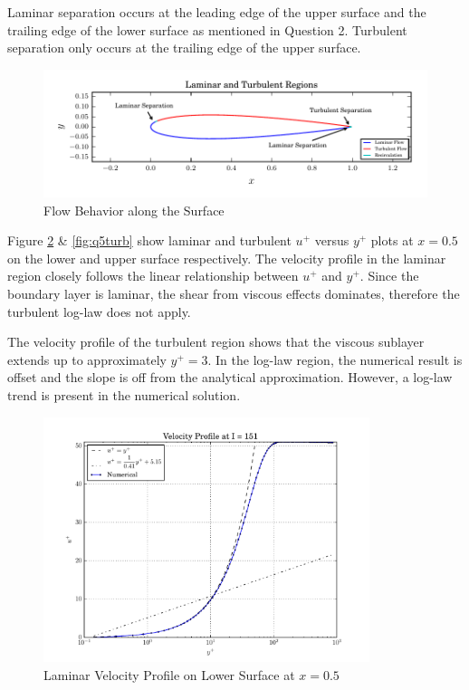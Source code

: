 \documentclass[letterpaper,12pt,]{article}
\begin{document}
Laminar separation occurs at the leading edge of the upper surface and the trailing edge of the lower surface as mentioned in Question 2.
Turbulent separation only occurs at the trailing edge of the upper surface.

\begin{figure}[!h]
    \centering
    \includegraphics[width = 1.0\textwidth]{./Figures/q4airfoil.pdf}
    \caption {Flow Behavior along the Surface}
    \label{fig:q4air}
\end{figure}

Figure \ref{fig:q5lam} \& \ref{fig:q5turb} show laminar and turbulent $u^+$ versus $y^+$ plots at $x=0.5$ on the lower and upper surface respectively.
The velocity profile in the laminar region closely follows the linear relationship between $u^+$ and $y^+$.
Since the boundary layer is laminar, the shear from viscous effects dominates, therefore the turbulent log-law does not apply.

The velocity profile of the turbulent region shows that the viscous sublayer extends up to approximately $y^+=3$.
In the log-law region, the numerical result is offset and the slope is off from the analytical approximation. However, a log-law trend is present in the numerical solution.


\begin{figure}
    \centering
    \includegraphics[width = 0.85\textwidth]{./Figures/q5lam.pdf}
    \caption {Laminar Velocity Profile on Lower Surface at $x=0.5$}
    \label{fig:q5lam}
\end{figure}
\end{document}

